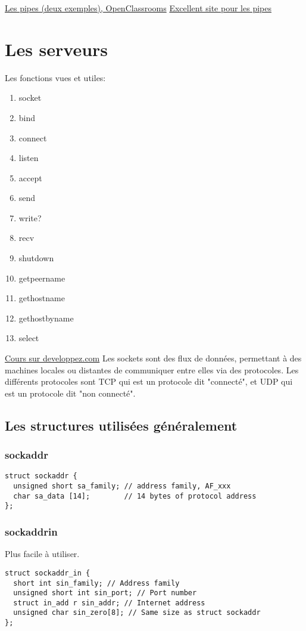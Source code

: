 \documentclass[a4paper]{article}
\begin{document}
\href{https://openclassrooms.com/courses/la-programmation-systeme-en-c-sous-unix/les-tubes}{Les pipes (deux exemples), OpenClassrooms}\newline
\href{http://www.zeitoun.net/articles/communication-par-tuyau/start}{Excellent site pour les pipes}
\newpage
\section{Les serveurs}
Les fonctions vues et utiles:
\begin{enumerate}
  \item socket
  \item bind
  \item connect
  \item listen
  \item accept
  \item send
  \item write?
  \item recv
  \item shutdown
  \item getpeername
  \item gethostname
  \item gethostbyname
  \item select
\end{enumerate}
\href{http://broux.developpez.com/articles/c/sockets/}{Cours sur developpez.com}
Les sockets sont des flux de données, permettant à des machines locales ou distantes de communiquer entre elles via des protocoles. Les différents protocoles sont TCP qui est un protocole dit "connecté", et UDP qui est un protocole dit "non connecté".
\subsection{Les structures utilisées généralement}
\subsubsection{sockaddr}
\begin{lstlisting}
struct sockaddr {
  unsigned short sa_family; // address family, AF_xxx
  char sa_data [14];        // 14 bytes of protocol address
};
\end{lstlisting}
\subsubsection{sockaddr\textunderscore{}in}
Plus facile à utiliser.
\begin{lstlisting}
struct sockaddr_in {
  short int sin_family; // Address family
  unsigned short int sin_port; // Port number
  struct in_add r sin_addr; // Internet address
  unsigned char sin_zero[8]; // Same size as struct sockaddr
};
\end{lstlisting}
\end{document}
